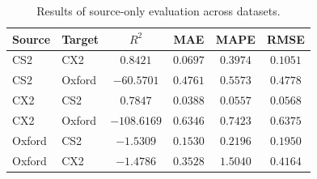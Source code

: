 \begin{table}
\TableStyle
\caption{Results of source-only evaluation across datasets.}
\label{tab:4-7}
\begin{tabularx}{\linewidth}{@{\extracolsep{\fill}}L{0.90}L{0.90}C{1.20}C{1.00}C{1.00}C{1.00}@{}}
\toprule
Source & Target & $R^2$ & MAE & MAPE & RMSE \\
\midrule
CS2 & CX2 & $0.8421$ & $0.0697$ & $0.3974$ & $0.1051$ \\
CS2 & Oxford & $-60.5701$ & $0.4761$ & $0.5573$ & $0.4778$ \\
CX2 & CS2 & $0.7847$ & $0.0388$ & $0.0557$ & $0.0568$ \\
CX2 & Oxford & $-108.6169$ & $0.6346$ & $0.7423$ & $0.6375$ \\
Oxford & CS2 & $-1.5309$ & $0.1530$ & $0.2196$ & $0.1950$ \\
Oxford & CX2 & $-1.4786$ & $0.3528$ & $1.5040$ & $0.4164$ \\
\bottomrule
\end{tabularx}
\end{table}
